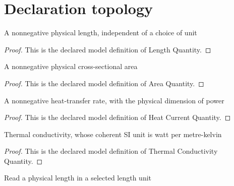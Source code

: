\section{Declaration topology}
\begin{definition}
  \label{def:physics:phyx-mini-0488:phyxminiproblems-problemphyxmini0488-lengthquantity}
  A nonnegative physical length, independent of a choice of unit
\end{definition}
\begin{proof}
  This is the declared model definition of Length Quantity.
\end{proof}
\begin{definition}
  \label{def:physics:phyx-mini-0488:phyxminiproblems-problemphyxmini0488-areaquantity}
  A nonnegative physical cross-sectional area
\end{definition}
\begin{proof}
  This is the declared model definition of Area Quantity.
\end{proof}
\begin{definition}
  \label{def:physics:phyx-mini-0488:phyxminiproblems-problemphyxmini0488-heatcurrentquantity}
  A nonnegative heat-transfer rate, with the physical dimension of power
\end{definition}
\begin{proof}
  This is the declared model definition of Heat Current Quantity.
\end{proof}
\begin{definition}
  \label{def:physics:phyx-mini-0488:phyxminiproblems-problemphyxmini0488-thermalconductivityquantity}
  Thermal conductivity, whose coherent SI unit is watt per metre-kelvin
\end{definition}
\begin{proof}
  This is the declared model definition of Thermal Conductivity Quantity.
\end{proof}
\begin{definition}
  \label{def:physics:phyx-mini-0488:phyxminiproblems-problemphyxmini0488-lengthreadout}
  Read a physical length in a selected length unit
\end{definition}
